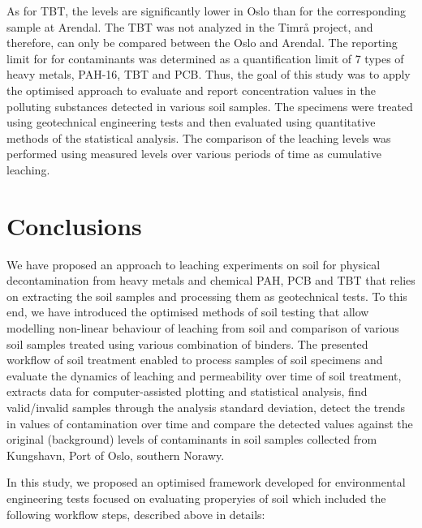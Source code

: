 \documentclass[algorithms,article,submit,pdftex,moreauthors]{Definitions/mdpi}
\begin{document}
As for TBT, the levels are significantly lower in Oslo than for the corresponding sample at Arendal. The TBT was not analyzed in the Timrå project, and therefore, can only be compared between the Oslo and Arendal. The reporting limit for for contaminants was determined as a quantification limit of 7 types of heavy metals, PAH-16, TBT and PCB. Thus, the goal of this study was to apply the optimised approach to evaluate and report concentration values in the polluting substances detected in various soil samples. The specimens were treated using geotechnical engineering tests and then evaluated using quantitative methods of the statistical analysis. The comparison of the leaching levels was performed using measured levels over various periods of time as cumulative leaching.

\section{Conclusions}

We have proposed an approach to leaching experiments on soil for physical decontamination from heavy metals and chemical PAH, PCB and TBT that relies on extracting the soil samples and processing them as geotechnical tests. To this end, we have introduced the optimised methods of soil testing that allow modelling non-linear behaviour of leaching from soil and comparison of various soil samples treated using various combination of binders. The presented workflow of soil treatment enabled to process samples of soil specimens and evaluate the dynamics of leaching and permeability over time of soil treatment, extracts data for computer-assisted plotting and statistical analysis, find valid/invalid samples through the analysis standard deviation, detect the trends in values of contamination over time and compare the detected values against the original (background) levels of contaminants in soil samples collected from Kungshavn, Port of Oslo, southern Norawy. 

In this study, we proposed an optimised framework developed for environmental engineering tests focused on evaluating properyies of soil which included the following workflow steps, described above in details: 
\end{document}
